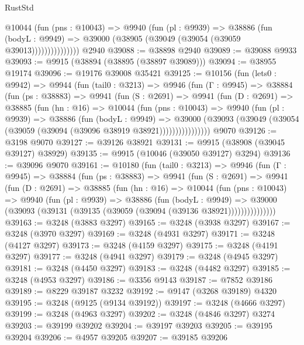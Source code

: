 \begin{lexlean}{RustStd}
\begin{coremodule}
                  @10044
                    (fun (pns : @10043) =>
                    @9940
                      (fun (pl : @9939) =>
                      @38886
                        (fun (bodyL : @9949) =>
                        @39000 (@38905 (@39049 (@39054 (@39059 @39013)))))))))))))))
    @2940
@39088 := @38898 @2940
@39089 := @39088 @9933
@39093 := @9915 (@38894 (@38895 (@38897 @39089)))
@39094 := @38955 @19174
@39096 := @19176 @39008 @35421
@39125 := @10156
    (fun (lets0 : @9942) =>
    @9944
      (fun (tail0 : @3213) =>
      @9946
        (fun (Γ : @9945) =>
        @38884
          (fun (ps : @38883) =>
          @9941
            (fun (S : @2691) =>
            @9941
              (fun (D : @2691) =>
              @38885
                (fun (hn : @16) =>
                @10044
                  (fun (pns : @10043) =>
                  @9940
                    (fun (pl : @9939) =>
                    @38886
                      (fun (bodyL : @9949) =>
                      @39000
                        (@39093
                          (@39049 (@39054 (@39059 (@39094 (@39096 @38919 @38921))))))))))))))))
    @9070
@39126 := @3198 @9070
@39127 := @39126 @38921
@39131 := @9915 (@38908 (@39045 @39127) @38929)
@39135 := @9915 (@10046 (@39050 @39127) @3294)
@39136 := @39096 @9070
@39161 := @10180
    (fun (tail0 : @3213) =>
    @9946
      (fun (Γ : @9945) =>
      @38884
        (fun (ps : @38883) =>
        @9941
          (fun (S : @2691) =>
          @9941
            (fun (D : @2691) =>
            @38885
              (fun (hn : @16) =>
              @10044
                (fun (pns : @10043) =>
                @9940
                  (fun (pl : @9939) =>
                  @38886
                    (fun (bodyL : @9949) =>
                    @39000 (@39093 (@39131 (@39135 (@39059 (@39094 (@39136 @38921)))))))))))))))
@39163 := @3248 (@3883 @3297)
@39165 := @3248 (@3938 @3297)
@39167 := @3248 (@3970 @3297)
@39169 := @3248 (@4931 @3297)
@39171 := @3248 (@4127 @3297)
@39173 := @3248 (@4159 @3297)
@39175 := @3248 (@4191 @3297)
@39177 := @3248 (@4941 @3297)
@39179 := @3248 (@4945 @3297)
@39181 := @3248 (@4450 @3297)
@39183 := @3248 (@4482 @3297)
@39185 := @3248 (@4953 @3297)
@39186 := @3356 @9143
@39187 := @7852 @39186
@39189 := @8229 @39187 @3232
@39192 := @9147 (@3268 @39189) @4320
@39195 := @3248 (@9125 (@9134 @39192))
@39197 := @3248 (@4666 @3297)
@39199 := @3248 (@4963 @3297)
@39202 := @3248 (@4846 @3297) @3274
@39203 := @39199 @39202
@39204 := @39197 @39203
@39205 := @39195 @39204
@39206 := @4957 @39205
@39207 := @39185 @39206

\end{coremodule}
\end{lexlean}
